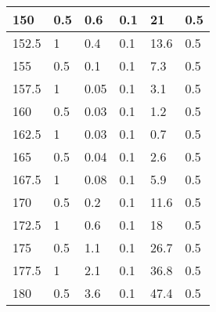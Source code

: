 \begin{center}
\begin{longtable}{|l|l|l|l|l|l|}
150   & 0.5         & 0.6             & 0.1         & 21            & 0.5           \\ \hline
152.5 & 1           & 0.4             & 0.1         & 13.6          & 0.5           \\ \hline
155   & 0.5         & 0.1             & 0.1         & 7.3           & 0.5           \\ \hline
157.5 & 1           & 0.05            & 0.1         & 3.1           & 0.5           \\ \hline
160   & 0.5         & 0.03            & 0.1         & 1.2           & 0.5           \\ \hline
162.5 & 1           & 0.03            & 0.1         & 0.7           & 0.5           \\ \hline
165   & 0.5         & 0.04            & 0.1         & 2.6           & 0.5           \\ \hline
167.5 & 1           & 0.08            & 0.1         & 5.9           & 0.5           \\ \hline
170   & 0.5         & 0.2             & 0.1         & 11.6          & 0.5           \\ \hline
172.5 & 1           & 0.6             & 0.1         & 18            & 0.5           \\ \hline
175   & 0.5         & 1.1             & 0.1         & 26.7          & 0.5           \\ \hline
177.5 & 1           & 2.1             & 0.1         & 36.8          & 0.5           \\ \hline
180   & 0.5         & 3.6             & 0.1         & 47.4          & 0.5           \\ \hline
\end{longtable}
\end{center}